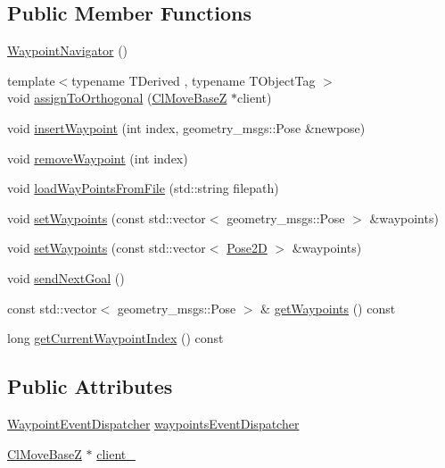 \subsection*{Public Member Functions}
\begin{DoxyCompactItemize}
\item 
\hyperlink{classsmacc_1_1WaypointNavigator_a8924fe11db589727a91048ffdba2a85f}{Waypoint\+Navigator} ()
\item 
{\footnotesize template$<$typename T\+Derived , typename T\+Object\+Tag $>$ }\\void \hyperlink{classsmacc_1_1WaypointNavigator_a8a192da9336c99bf05dc65a12e70e936}{assign\+To\+Orthogonal} (\hyperlink{classsmacc_1_1ClMoveBaseZ}{Cl\+Move\+BaseZ} $\ast$client)
\item 
void \hyperlink{classsmacc_1_1WaypointNavigator_abdcd86738247eccaf849903881247b0d}{insert\+Waypoint} (int index, geometry\+\_\+msgs\+::\+Pose \&newpose)
\item 
void \hyperlink{classsmacc_1_1WaypointNavigator_a4c290be90b5bfa44687f8beaa867f9b8}{remove\+Waypoint} (int index)
\item 
void \hyperlink{classsmacc_1_1WaypointNavigator_a3324ee12d697827e242b48ab3fd23edb}{load\+Way\+Points\+From\+File} (std\+::string filepath)
\item 
void \hyperlink{classsmacc_1_1WaypointNavigator_a2cb7fb208ade09ed7af4585837d051ee}{set\+Waypoints} (const std\+::vector$<$ geometry\+\_\+msgs\+::\+Pose $>$ \&waypoints)
\item 
void \hyperlink{classsmacc_1_1WaypointNavigator_a035fd5f71532fa87981a477fde5d363c}{set\+Waypoints} (const std\+::vector$<$ \hyperlink{structsmacc_1_1Pose2D}{Pose2D} $>$ \&waypoints)
\item 
void \hyperlink{classsmacc_1_1WaypointNavigator_a127438f90a00e98628ebd64b4c84b0b7}{send\+Next\+Goal} ()
\item 
const std\+::vector$<$ geometry\+\_\+msgs\+::\+Pose $>$ \& \hyperlink{classsmacc_1_1WaypointNavigator_afe1e18903d81f1d3eb20e2689f25b2ca}{get\+Waypoints} () const 
\item 
long \hyperlink{classsmacc_1_1WaypointNavigator_a6da63a864cb26b56922ca8c685e1a49c}{get\+Current\+Waypoint\+Index} () const 
\end{DoxyCompactItemize}
\subsection*{Public Attributes}
\begin{DoxyCompactItemize}
\item 
\hyperlink{classsmacc_1_1WaypointEventDispatcher}{Waypoint\+Event\+Dispatcher} \hyperlink{classsmacc_1_1WaypointNavigator_aab7ff616b0eba7a5ad5f03113f2de8fd}{waypoints\+Event\+Dispatcher}
\item 
\hyperlink{classsmacc_1_1ClMoveBaseZ}{Cl\+Move\+BaseZ} $\ast$ \hyperlink{classsmacc_1_1WaypointNavigator_a2bdb0d4aea851d877fcb20e6d0897bb8}{client\+\_\+}
\end{DoxyCompactItemize}
